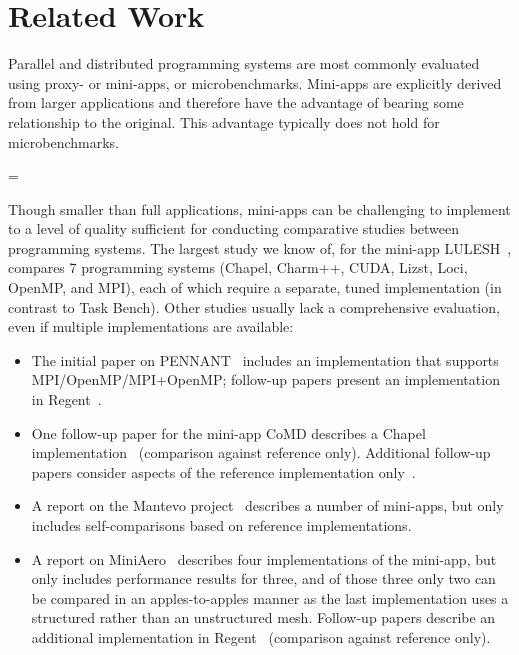 \section{Related Work}
\label{sec:related-work}

\let\oldbrokenpenalty\brokenpenalty
{}

Parallel and distributed programming systems are most
commonly evaluated using proxy- or mini-apps, or
microbenchmarks. Mini-apps are explicitly derived from larger
applications and therefore have the advantage of bearing some
relationship to the original. This advantage typically does not hold
for microbenchmarks.

\brokenpenalty=\oldbrokenpenalty

Though smaller than full applications, mini-apps can be challenging to
implement to a level of quality sufficient for conducting comparative
studies between programming systems. The largest study we know of,
for the mini-app LULESH~\cite{LULESH13}, compares 7 programming
systems (Chapel, Charm++, CUDA, Lizst, Loci, OpenMP, and MPI), each of
which require a separate, tuned implementation (in contrast to
Task Bench). Other
studies usually lack a comprehensive evaluation, even if multiple
implementations are available:

\begin{itemize}

\item
The initial paper on PENNANT~\cite{PENNANT} includes an
implementation that supports MPI/OpenMP/MPI+OpenMP; follow-up papers present an implementation in
Regent~\cite{Regent15, ControlReplication17, LegionTracing18}.

\item
One follow-up paper for the mini-app CoMD describes a Chapel
implementation~\cite{CoMDChapel16} (comparison against reference
only). Additional follow-up papers consider aspects of the reference
implementation only~\cite{CoMDLoadImbalance17,
  CoMDThreadedModels14}.

\item
A report on the Mantevo project~\cite{Mantevo09} describes a number of
mini-apps, but only includes self-comparisons based on reference
implementations.

\item
A report on MiniAero~\cite{SandiaReportManyTaskRuntimes15} describes
four implementations of the mini-app, but only includes performance
results for three, and of those three only two can be compared in an
apples-to-apples manner as the last implementation uses a structured
rather than an unstructured mesh. Follow-up papers describe an
additional implementation in Regent~\cite{Regent15,
  ControlReplication17, LegionTracing18} (comparison against reference
only).

\end{itemize}

